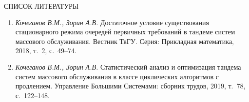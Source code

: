 \documentclass{article}
\begin{document}
 \begin{center}
СПИСОК ЛИТЕРАТУРЫ
 \end{center}
 
 \begin{enumerate}
\item {\it Кочеганов В.М., Зорин А.В.}
Достаточное условие существования стационарного режима очередей первичных требований в тандеме систем массового обслуживания. Вестник ТвГУ. Серия: Прикладная математика, 2018, т.~2, с.~49--74.

\item {\it Кочеганов В.М., Зорин А.В.}
Статистический анализ и оптимизация тандема
систем массового обслуживания в классе циклических алгоритмов с продлением. Управление Большими Системами: сборник трудов, 2019, т.~78, с.~122--148.


 \end{enumerate}
\end{document}

